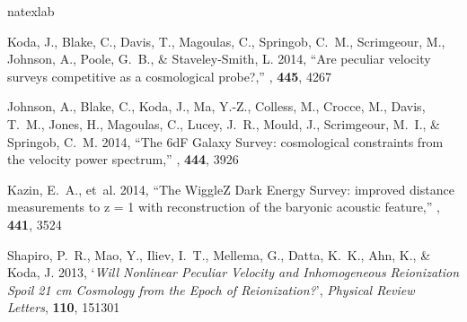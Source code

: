 
\renewcommand{\section}[2]{\vspace{2\baselineskip}\refstepcounter{section}{\bf \textsf{#2}}\vspace{0.25\baselineskip}}
\renewcommand{\refname}{Submitted / Refereed Publications}
\begin{thebibliography}{8}
\expandafter\ifx\csname natexlab\endcsname\relax\def\natexlab#1{#1}\fi

{Koda}, J., {Blake}, C., {Davis}, T., {Magoulas}, C., {Springob}, C.~M.,
  {Scrimgeour}, M., {Johnson}, A., {Poole}, G.~B., \& {Staveley-Smith}, L.
  2014, ``{Are peculiar velocity surveys competitive as a cosmological
  probe?},'' {\em \mnras\/}, {\bf 445}, 4267

{Johnson}, A., {Blake}, C., {Koda}, J., {Ma}, Y.-Z., {Colless}, M., {Crocce},
  M., {Davis}, T.~M., {Jones}, H., {Magoulas}, C., {Lucey}, J.~R., {Mould}, J.,
  {Scrimgeour}, M.~I., \& {Springob}, C.~M. 2014, ``{The 6dF Galaxy Survey:
  cosmological constraints from the velocity power spectrum},'' {\em \mnras\/},
  {\bf 444}, 3926

{Kazin}, E.~A., {et~al.} 2014, ``{The WiggleZ Dark Energy Survey: improved
  distance measurements to z = 1 with reconstruction of the baryonic acoustic
  feature},'' {\em \mnras\/}, {\bf 441}, 3524

{Shapiro}, P.~R., {Mao}, Y., {Iliev}, I.~T., {Mellema}, G., {Datta}, K.~K.,
  {Ahn}, K., \& {Koda}, J. 2013, `{\it Will Nonlinear Peculiar Velocity and
  Inhomogeneous Reionization Spoil 21 cm Cosmology from the Epoch of
  Reionization?}', {\em Physical Review Letters\/}, {\bf 110}, 151301


\end{thebibliography}
